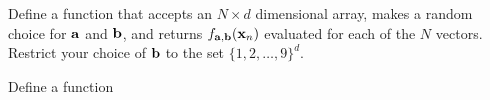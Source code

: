 \begin{problem}
\label{prob:fab}
Define a function that accepts an $N \times d$ dimensional array, makes a random
choice for ${\bf a}$ and ${\bf b}$, and returns $f_{{\bf a},{\bf b}}({\bf x}_n)$ evaluated for
each of the $N$ vectors. Restrict your choice of ${\bf b}$ to the set
$\{1,2,\ldots,9\}^d$.
\end{problem}

\begin{problem}
\label{prob:err}
Define a function 
\end{problem}
